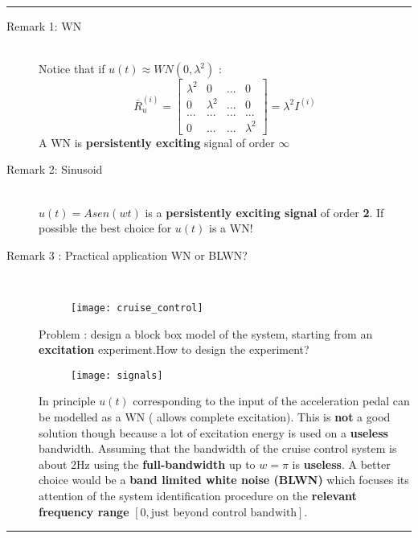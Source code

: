 \par\noindent\rule{\textwidth}{0.4pt}
\begin{description}
\item[Remark 1: WN]\hfill\\
Notice that if $u(t) \approx WN(0,\lambda^2)$ :
$$
\bar{R}^{(i)}_{u} = 
	\begin{bmatrix}
        \lambda^2 & 0 & ... & 0           \\[0.3em]
       0 & \lambda^2 &...  & 0          \\[0.3em]
       ... & ... & ... 	& ...								   \\[0.3em]
       0 & ... & ... & \lambda^2
     \end{bmatrix} = \lambda^2 I^{(i)}
$$
A WN is \textbf{persistently exciting} signal of order $\infty$
\item [Remark 2: Sinusoid]\hfill\\
$u(t) =Asen(wt)$  is a \textbf{persistently exciting signal} of order \textbf{2}.
If possible the best choice for $u(t)$ is a WN!
\newpage
\item [Remark 3 : Practical application WN or BLWN?]\hfill\\
\begin{figure}[H]
 \centering
  \texttt{[image: cruise\_control]}
\end{figure}
Problem : design a block box model of the system, starting from an \textbf{excitation} experiment.How to design the experiment?\\
\begin{figure}[H]
 \centering
  \texttt{[image: signals]}
\end{figure}
In principle $u(t)$ corresponding to the input of the acceleration pedal can be modelled as a WN ( allows complete excitation). This is \textbf{not} a good solution though because a lot of excitation energy is used on a \textbf{useless} bandwidth.
Assuming that the bandwidth of the cruise control system is about 2Hz  using the \textbf{full-bandwidth} up to $w = \pi $ is \textbf{useless}. A better choice would be a \textbf{band limited white noise (BLWN)} which focuses its attention of the system identification procedure on the \textbf{relevant frequency range} $[0 , \text{just beyond control bandwith}]$.
\end{description}
\par\noindent\rule{\textwidth}{0.4pt}

